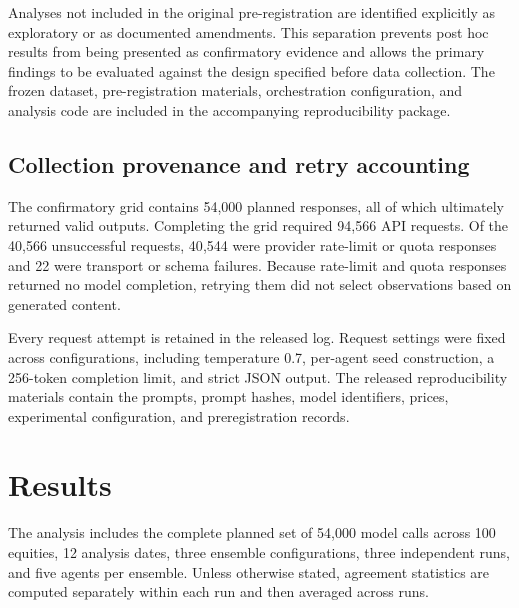 \documentclass{ieeeaccess}
\begin{document}
Analyses not included in the original pre-registration are identified explicitly
as exploratory or as documented amendments. This separation prevents post hoc
results from being presented as confirmatory evidence and allows the primary
findings to be evaluated against the design specified before data collection.
The frozen dataset, pre-registration materials, orchestration configuration, and
analysis code are included in the accompanying reproducibility package.

\subsection{Collection provenance and retry accounting}
\label{subsec:provenance}
The confirmatory grid contains 54{,}000 planned responses, all of which
ultimately returned valid outputs. Completing the grid required 94{,}566 API
requests. Of the 40{,}566 unsuccessful requests, 40{,}544 were provider
rate-limit or quota responses and 22 were transport or schema failures. Because
rate-limit and quota responses returned no model completion, retrying them did
not select observations based on generated content.

Every request attempt is retained in the released log. Request settings were
fixed across configurations, including temperature 0.7, per-agent seed
construction, a 256-token completion limit, and strict JSON output. The released
reproducibility materials contain the prompts, prompt hashes, model identifiers,
prices, experimental configuration, and preregistration records.

\section{Results}
The analysis includes the complete planned set of 54{,}000 model calls across
100 equities, 12 analysis dates, three ensemble configurations, three
independent runs, and five agents per ensemble. Unless otherwise stated,
agreement statistics are computed separately within each run and then averaged
across runs.
\end{document}
